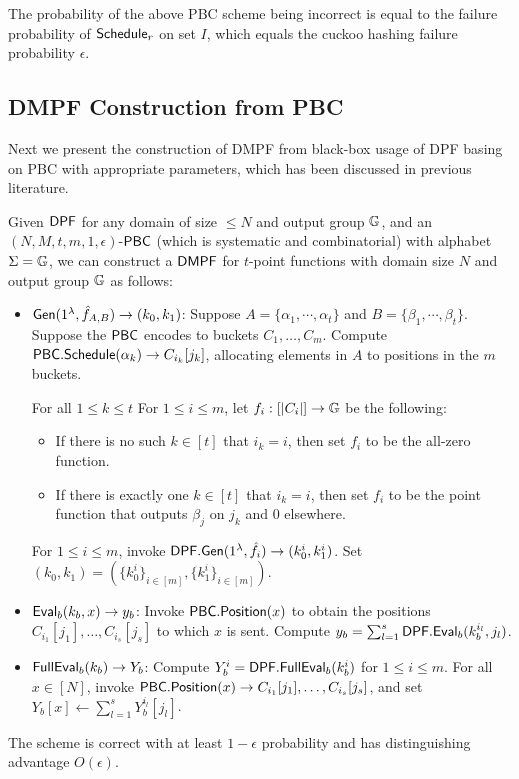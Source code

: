 The probability of the above PBC scheme being incorrect is equal to the failure probability of ${\sf Schedule}_r$ on set $I$, which equals the cuckoo hashing failure probability $\epsilon$. 

\subsection{DMPF Construction from PBC}
Next we present the construction of DMPF from black-box usage of DPF basing on PBC with appropriate parameters, which has been discussed in previous literature. 
\begin{construction}\label{con:DMPF_batch_code}
  Given ${\sf DPF}$ for any domain of size $\le N$ and output group $\mathbb{G}$, and an $(N,M,t,m,1,\epsilon)$-${\sf PBC}$ (which is systematic and combinatorial) with alphabet $\Sigma=\mathbb{G}$, we can construct a ${\sf DMPF}$ for $t$-point functions with domain size $N$ and output group $\mathbb{G}$ as follows: 
  \begin{itemize}
    \item ${\sf Gen}(1^\lambda, \hat{f}_{A,B})\rightarrow (k_0,k_1)$: Suppose $A=\{\alpha_1,\cdots,\alpha_t\}$ and $B=\{\beta_1,\cdots,\beta_t\}$. Suppose the ${\sf PBC}$ encodes to buckets $C_1,\dots,C_m$. Compute ${\sf PBC}.{\sf Schedule}(\alpha_k)\rightarrow C_{i_k}[j_k]$, allocating elements in $A$ to positions in the $m$ buckets.     
    
    For all $1\le k\le t$ For $1\le i\le m$, let $f_i:[|C_i|]\rightarrow \mathbb{G}$ be the following: 
    \begin{itemize}
      \item If there is no such $k\in[t]$ that $i_k = i$, then set $f_i$ to be the all-zero function. 
      \item If there is exactly one $k\in[t]$ that  $i_k = i$, then set $f_i$ to be the point function that outputs $\beta_j$ on $j_k$ and 0 elsewhere. 
    \end{itemize}
    For $1\le i\le m$, invoke ${\sf DPF}.{\sf Gen}(1^\lambda, \hat{f}_i)\rightarrow (k_0^i,k_1^i)$. Set $(k_0,k_1)=(\{k_0^i\}_{i\in [m]}, \{k_1^i\}_{i\in [m]})$. 
    \item ${\sf Eval}_b(k_b,x)\rightarrow y_b$: Invoke ${\sf PBC}.{\sf Position}(x)$ to obtain the positions $C_{i_1}[j_1],\dots,C_{i_s}[j_s]$ to which $x$ is sent. Compute $y_b=\sum_{l=1}^s{\sf DPF}.{\sf Eval}_b(k_b^{i_l},j_l)$. 
    \item ${\sf FullEval}_b(k_b)\rightarrow Y_b$: Compute $Y_b^i = {\sf DPF}.{\sf FullEval}_b(k_b^i)$ for $1\le i\le m$. For all $x\in [N]$, invoke ${\sf PBC}.{\sf Position}(x)\rightarrow C_{i_1}[j_1],\dots,C_{i_s}[j_s]$, and set $Y_b[x]\gets \sum_{l=1}^sY_b^{i_l}[j_l]$. 
  \end{itemize}
The scheme is correct with at least $1-\epsilon$ probability and has distinguishing advantage $O(\epsilon)$. 
\end{construction}

